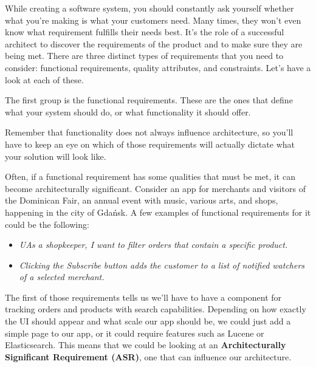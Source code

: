 
While creating a software system, you should constantly ask yourself whether what you're making is what your customers need. Many times, they won't even know what requirement fulfills their needs best. It's the role of a successful architect to discover the requirements of the product and to make sure they are being met. There are three distinct types of requirements that you need to consider: functional requirements, quality attributes, and constraints. Let's have a look at each of these.


The first group is the functional requirements. These are the ones that define what your system should do, or what functionality it should offer.


\begin{tcolorbox}[colback=webgreen!5!white,colframe=webgreen!75!black, title=TIP]
\hspace*{0.7cm}Remember that functionality does not always influence architecture, so you'll have to keep an eye on which of those requirements will actually dictate what your solution will look like.
\end{tcolorbox}

Often, if a functional requirement has some qualities that must be met, it can become architecturally significant. Consider an app for merchants and visitors of the Dominican Fair, an annual event with music, various arts, and shops, happening in the city of Gdańsk. A few examples of functional requirements for it could be the following:

\begin{itemize}
\item \textit{UAs a shopkeeper, I want to filter orders that contain a specific product.}
\item \textit{Clicking the Subscribe button adds the customer to a list of notified watchers of a selected merchant.}
\end{itemize}

The first of those requirements tells us we'll have to have a component for tracking orders and products with search capabilities. Depending on how exactly the UI should appear and what scale our app should be, we could just add a simple page to our app, or it could require features such as Lucene or Elasticsearch. This means that we could be looking at an \textbf{Architecturally Significant Requirement (ASR)}, one that can influence our architecture.

